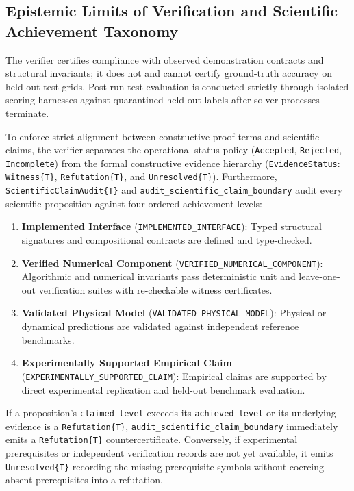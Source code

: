 \subsection{Epistemic Limits of Verification and Scientific Achievement Taxonomy}
\sloppy
The verifier certifies compliance with observed demonstration contracts and structural invariants; it does not and cannot certify ground-truth accuracy on held-out test grids. Post-run test evaluation is conducted strictly through isolated scoring harnesses against quarantined held-out labels after solver processes terminate.

To enforce strict alignment between constructive proof terms and scientific claims, the verifier separates the operational status policy (\texttt{Accepted}, \texttt{Rejected}, \texttt{Incomplete}) from the formal constructive evidence hierarchy (\texttt{EvidenceStatus}: \texttt{Witness\{T\}}, \texttt{Refutation\{T\}}, and \texttt{Unresolved\{T\}}). Furthermore, \texttt{ScientificClaimAudit\{T\}} and \texttt{audit\_scientific\_claim\_boundary} audit every scientific proposition against four ordered achievement levels:
\begin{enumerate}
  \item \textbf{Implemented Interface} (\texttt{IMPLEMENTED\_INTERFACE}): Typed structural signatures and compositional contracts are defined and type-checked.
  \item \textbf{Verified Numerical Component} (\texttt{VERIFIED\_NUMERICAL\_COMPONENT}): Algorithmic and numerical invariants pass deterministic unit and leave-one-out verification suites with re-checkable witness certificates.
  \item \textbf{Validated Physical Model} (\texttt{VALIDATED\_PHYSICAL\_MODEL}): Physical or dynamical predictions are validated against independent reference benchmarks.
  \item \textbf{Experimentally Supported Empirical Claim} (\texttt{EXPERIMENTALLY\_SUPPORTED\_CLAIM}): Empirical claims are supported by direct experimental replication and held-out benchmark evaluation.
\end{enumerate}
If a proposition's \texttt{claimed\_level} exceeds its \texttt{achieved\_level} or its underlying evidence is a \texttt{Refutation\{T\}}, \texttt{audit\_scientific\_claim\_boundary} immediately emits a \texttt{Refutation\{T\}} countercertificate. Conversely, if experimental prerequisites or independent verification records are not yet available, it emits \texttt{Unresolved\{T\}} recording the missing prerequisite symbols without coercing absent prerequisites into a refutation.
\fussy

